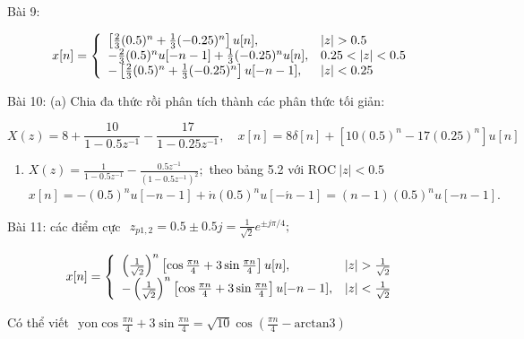 \documentclass[
  10
]{article}
\providecommand{\tightlist}{%
  \setlength{\itemsep}{0pt}\setlength{\parskip}{0pt}}
\begin{document}
Bài 9:

\[
x [ n ] = \left\{ \begin{array}{l l} \left[ \frac {2}{3} (0. 5) ^ {n} + \frac {1}{3} (- 0. 2 5) ^ {n} \right] u [ n ], & | z | > 0. 5 \\ - \frac {2}{3} (0. 5) ^ {n} u [ - n - 1 ] + \frac {1}{3} (- 0. 2 5) ^ {n} u [ n ], & 0. 2 5 <   | z | <   0. 5 \\ - \left[ \frac {2}{3} (0. 5) ^ {n} + \frac {1}{3} (- 0. 2 5) ^ {n} \right] u [ - n - 1 ], & | z | <   0. 2 5 \end{array} \right.
\]

Bài 10: (a) Chia đa thức rồi phân tích thành các phân thức tối giản:

\[
X (z) = 8 + \frac {1 0}{1 - 0 . 5 z ^ {- 1}} - \frac {1 7}{1 - 0 . 2 5 z ^ {- 1}}, \quad x [ n ] = 8 \delta [ n ] + [ 1 0 (0. 5) ^ {n} - 1 7 (0. 2 5) ^ {n} ] u [ n ]
\]

\begin{enumerate}
\def\labelenumi{(\alph{enumi})}
\setcounter{enumi}{1}
\tightlist
\item
  \(X ( z ) = { \frac { 1 } { 1 - 0 . 5 z ^ { - 1 } } } - { \frac { 0 . 5 z ^ { - 1 } } { ( 1 - 0 . 5 z ^ { - 1 } ) ^ { 2 } } } ;\)
  theo bảng 5.2 với \(\mathrm { R O C } \ | z | < 0 . 5\)
  \(x [ n ] = - ( 0 . 5 ) ^ { n } u [ - n - 1 ] + \dot { n } ( 0 . 5 ) ^ { n } u [ - \acute { n } - 1 ] = ( n - 1 ) ( 0 . 5 ) ^ { n } u [ - n - 1 ] .\)
\end{enumerate}

Bài 11: các điểm cực
\(\begin{array} { r } { z _ { p 1 , 2 } = 0 . 5 \pm 0 . 5 j = \frac { 1 } { \sqrt { 2 } } e ^ { \pm j \pi / 4 } ; } \end{array}\)

\[
x [ n ] = \left\{ \begin{array}{l l} \left(\frac {1}{\sqrt {2}}\right) ^ {n} \left[ \cos \frac {\pi n}{4} + 3 \sin \frac {\pi n}{4} \right] u [ n ], & | z | > \frac {1}{\sqrt {2}} \\ - \left(\frac {1}{\sqrt {2}}\right) ^ {n} \left[ \cos \frac {\pi n}{4} + 3 \sin \frac {\pi n}{4} \right] u [ - n - 1 ], & | z | <   \frac {1}{\sqrt {2}} \end{array} \right.
\]

Có thể viết
\(\begin{array} { r } { \mathrm { y o n } \cos { \frac { \pi n } { 4 } } + 3 \sin { \frac { \pi n } { 4 } } = \sqrt { 1 0 } \cos { \left( \frac { \pi n } { 4 } - \mathrm { a r c t a n } 3 \right) } } \end{array}\)
\end{document}
